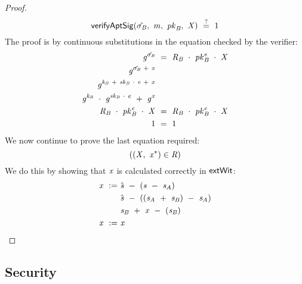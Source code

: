 \begin{proof}
    \[
        \mathsf{verifyAptSig}(\hat{\sigma_{\mathit{B}}} ,~ \mathit{m} ,~ \mathit{pk}_{\mathit{B}} ,~ \mathit{X}) ~\stackrel{?}{=}~ 1
    \]
    The proof is by continuous substitutions in the equation checked by the verifier:
    \begin{align}
        \mathit{g}^{\hat{\sigma_{\mathit{B}}}} &~=~ \mathit{R}_{\mathit{B}} ~\cdot~ \mathit{pk}_{\mathit{B}}^{\mathit{e}} ~\cdot~ \mathit{X} \\
        \mathit{g}^{\tilde{\sigma_{\mathit{B}}} ~+~ \mathit{x}} & \\
        \mathit{g}^{\mathit{\mathit{k}_{\mathit{B}}} ~+~ \mathit{sk}_{\mathit{B}} ~\cdot~ \mathit{e} ~+~ \mathit{x}} & \\
        \mathit{g}^{\mathit{\mathit{k}_{\mathit{B}}}} ~\cdot~ \mathit{g}^{\mathit{sk}_{\mathit{B}} ~\cdot~ \mathit{e}} ~+~ \mathit{g}^{\mathit{x}} & \\
        \mathit{R}_{\mathit{B}} ~\cdot~ \mathit{pk}_{\mathit{B}}^{\mathit{e}} ~\cdot~ \mathit{X} &~=~ \mathit{R}_{\mathit{B}} ~\cdot~ \mathit{pk}_{\mathit{B}}^{\mathit{e}} ~\cdot~ \mathit{X} \\
        1 &~=~ 1
    \end{align}
    We now continue to prove the last equation required:
    \[
        ((\mathit{X} ,~ \mathit{x}^*) \in \mathit{R})
    \]
    We do this by showing that $\mathit{x}$ is calculated correctly in $\mathsf{extWit}$:
    \begin{align}
        \mathit{x} ~:=~ & \hat{\mathit{s}} ~-~ (\mathit{s} ~-~ \mathit{s}_{\mathit{A}}) \\
        & \hat{\mathit{s}} ~-~ ((\mathit{s}_{\mathit{A}} ~+~ \mathit{s}_{\mathit{B}} ) ~-~ \mathit{s}_{\mathit{A}} ) \\
        & \mathit{s}_{\mathit{B}} ~+~ \mathit{x} ~-~ (\mathit{s}_{\mathit{B}}) \\
        \mathit{x} ~:=~ & \mathit{x} \\
    \end{align}
\end{proof}

\subsection{Security}\label{subsec:sig:secureaptscheme}


